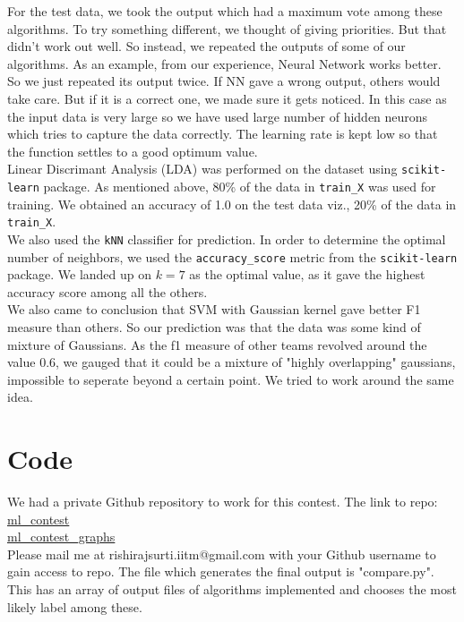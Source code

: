 \documentclass[a4paper]{article}
\begin{document}
For the test data, we took the output which had a maximum vote among these algorithms.
To try something different, we thought of giving priorities. But that didn't work out well. So instead, we repeated the outputs of some of our algorithms. As an example, from our experience, Neural Network works better. So we just repeated its output twice. If NN gave a wrong output, others would take care. But if it is a correct one, we made sure it gets noticed. In this case as the input data is very large so we have used large number of hidden neurons which tries to capture the data correctly. The learning rate is kept low so that the function settles to a good optimum value. \\

Linear Discrimant Analysis (LDA) was performed on the dataset using \texttt{scikit-\\learn} package. As mentioned above, 80\% of the data in \texttt{train\_X} was used for training. We obtained an accuracy of 1.0 on the test data viz., 20\% of the data in \texttt{train\_X}.\\

We also used the \texttt{kNN} classifier for prediction. In order to determine the optimal number of neighbors, we used the \texttt{accuracy\_score} metric from the \texttt{scikit-learn} package. We landed up on $k=7$ as the optimal value, as it gave the highest accuracy score among all the others.\\

We also came to conclusion that SVM with Gaussian kernel gave better F1 measure than others. So our prediction was that the data was some kind of mixture of Gaussians. As the f1 measure of other teams revolved around the value 0.6, we gauged that it could be a mixture of "highly overlapping" gaussians, impossible to seperate beyond a certain point. We tried to work around the same idea. 


\section{Code}
We had a private Github repository to work for this contest.
The link to repo:\\ \href{https://github.com/rishirajsurti/ml_contest}{ml\_contest} \\
\href{https://github.com/rishirajsurti/ml_contest/graphs/contributors}{ml\_contest\_graphs}\\
Please mail me at rishirajsurti.iitm@gmail.com with your Github username to gain access to repo.
The file which generates the final output is "compare.py".
This has an array of output files of algorithms implemented and chooses the most likely label among these.
\end{document}
